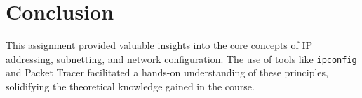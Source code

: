 \documentclass[12pt]{article}
\begin{document}
\section{Conclusion}
This assignment provided valuable insights into the core concepts of IP addressing, subnetting, and network configuration. The use of tools like \texttt{ipconfig} and Packet Tracer facilitated a hands-on understanding of these principles, solidifying the theoretical knowledge gained in the course.
\end{document}
